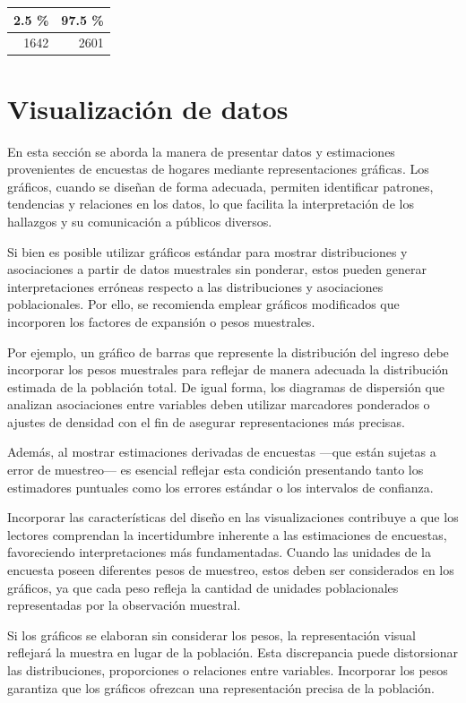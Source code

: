 \documentclass[
  12pt,
]{book}
\begin{document}
\begin{tabular}{r|r}
\hline
2.5 \% & 97.5 \%\\
\hline
1642 & 2601\\
\hline
\end{tabular}

\chapter{Visualización de datos}\label{visualizaciuxf3n-de-datos}

En esta sección se aborda la manera de presentar datos y estimaciones provenientes de encuestas de hogares mediante representaciones gráficas. Los gráficos, cuando se diseñan de forma adecuada, permiten identificar patrones, tendencias y relaciones en los datos, lo que facilita la interpretación de los hallazgos y su comunicación a públicos diversos.

Si bien es posible utilizar gráficos estándar para mostrar distribuciones y asociaciones a partir de datos muestrales sin ponderar, estos pueden generar interpretaciones erróneas respecto a las distribuciones y asociaciones poblacionales. Por ello, se recomienda emplear gráficos modificados que incorporen los factores de expansión o pesos muestrales.

Por ejemplo, un gráfico de barras que represente la distribución del ingreso debe incorporar los pesos muestrales para reflejar de manera adecuada la distribución estimada de la población total. De igual forma, los diagramas de dispersión que analizan asociaciones entre variables deben utilizar marcadores ponderados o ajustes de densidad con el fin de asegurar representaciones más precisas.

Además, al mostrar estimaciones derivadas de encuestas ---que están sujetas a error de muestreo--- es esencial reflejar esta condición presentando tanto los estimadores puntuales como los errores estándar o los intervalos de confianza.

Incorporar las características del diseño en las visualizaciones contribuye a que los lectores comprendan la incertidumbre inherente a las estimaciones de encuestas, favoreciendo interpretaciones más fundamentadas. Cuando las unidades de la encuesta poseen diferentes pesos de muestreo, estos deben ser considerados en los gráficos, ya que cada peso refleja la cantidad de unidades poblacionales representadas por la observación muestral.

Si los gráficos se elaboran sin considerar los pesos, la representación visual reflejará la muestra en lugar de la población. Esta discrepancia puede distorsionar las distribuciones, proporciones o relaciones entre variables. Incorporar los pesos garantiza que los gráficos ofrezcan una representación precisa de la población.
\end{document}
